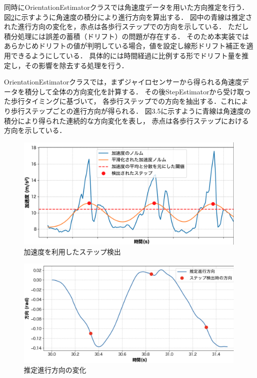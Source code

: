同時にOrientationEstimatorクラスでは角速度データを用いた方向推定を行う．
図\ref{fig:step_timing}に示すように角速度の積分により進行方向を算出する．
図中の青線は推定された進行方向の変化を，赤点は各歩行ステップでの方向を示している．
ただし積分処理には誤差の蓄積（ドリフト）の問題が存在する．
そのため本実装ではあらかじめドリフトの値が判明している場合，値を設定し線形ドリフト補正を適用できるようにしている．%
具体的には時間経過に比例する形でドリフト量を推定し，その影響を除去する処理を行う．

OrientationEstimatorクラスでは，まずジャイロセンサーから得られる角速度データを積分して全体の方向変化を計算する．
その後StepEstimatorから受け取った歩行タイミングに基づいて，
各歩行ステップでの方向を抽出する．これにより歩行ステップごとの進行方向が得られる．
図3.5に示すように青線は角速度の積分により得られた連続的な方向変化を表し，
赤点は各歩行ステップにおける方向を示している．

\begin{figure}[H]
	\centering
	\includegraphics[width=\linewidth]{../image/step_detect.jpg}
	\caption{加速度を利用したステップ検出}    \label{fig:step_detect}
\end{figure}

\begin{figure}[H]
	\centering
	\includegraphics[width=\linewidth]{../image/step_timing_angle.jpg}
	\caption{推定進行方向の変化}    \label{fig:step_timing}
\end{figure}


